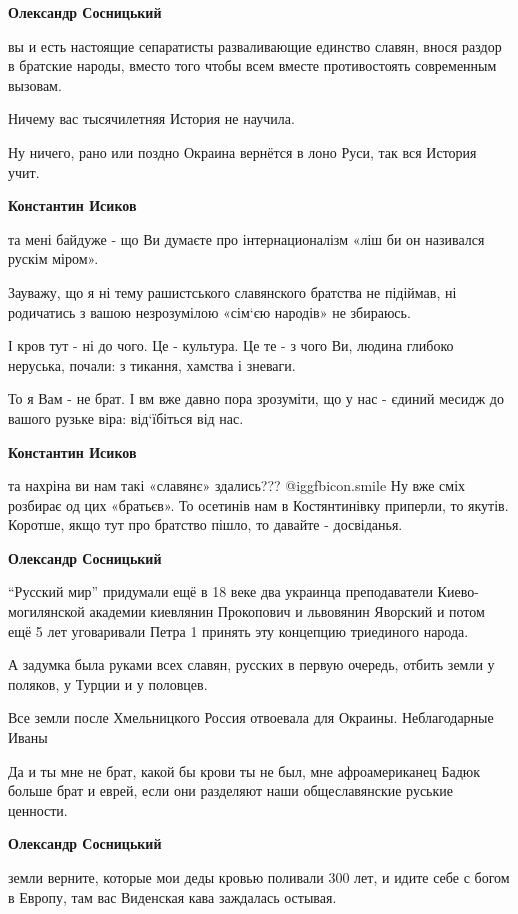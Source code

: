 \begin{itemize}
\begin{itemize}
\textbf{Олександр Сосницький} 

вы и есть настоящие сепаратисты разваливающие единство славян, внося раздор в
братские народы, вместо того чтобы всем вместе противостоять современным
вызовам.

Ничему вас тысячилетняя История не научила.

Ну ничего, рано или поздно Окраина вернётся в лоно Руси, так вся История учит.

\textbf{Константин Исиков} 

та мені байдуже - що Ви думаєте про інтернационалізм «ліш би он називался
рускім міром».

Зауважу, що я ні тему рашистського славянского братства не підіймав, ні
родичатись з вашою незрозумілою «сім‘єю народів» не збираюсь.

І кров тут - ні до чого. Це - культура. Це те - з чого Ви, людина глибоко
неруська, почали: з тикання, хамства і зневаги.

То я Вам - не брат. І вм вже давно пора зрозуміти, що у нас - єдиний месидж до
вашого рузьке віра: від‘їбіться від нас.

\textbf{Константин Исиков} 

та нахріна ви нам такі «славянє» здались???  @igg{fbicon.smile}  Ну вже сміх розбирає од цих
«братьєв». То осетинів нам в Костянтинівку приперли, то якутів. Коротше, якщо
тут про братство пішло, то давайте - досвіданья.

\textbf{Олександр Сосницький} 

\enquote{Русский мир} придумали ещё в 18 веке два украинца преподаватели
Киево-могилянской академии киевлянин Прокопович и львовянин Яворский и потом
ещё 5 лет уговаривали Петра 1 принять эту концепцию триединого народа.

А задумка была руками всех славян, русских в первую очередь, отбить земли у
поляков, у Турции и у половцев.

Все земли после Хмельницкого Россия отвоевала для Окраины. Неблагодарные Иваны

Да и ты мне не брат, какой бы крови ты не был, мне афроамериканец Бадюк больше
брат и еврей, если они разделяют наши общеславянские руськие ценности.

\textbf{Олександр Сосницький} 

земли верните, которые мои деды кровью поливали 300 лет, и идите себе с богом в
Европу, там вас Виденская кава заждалась остывая.


\end{itemize}
\end{itemize}
